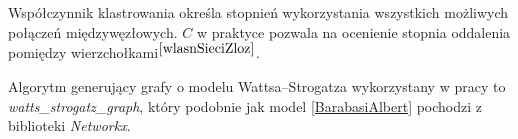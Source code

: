 \documentclass[a4paper, 12pt, twoside, openright]{article}
\begin{document}
	Współczynnik klastrowania określa stopnień wykorzystania wszystkich możliwych połączeń międzywęzłowych. $C$ w praktyce pozwala na ocenienie stopnia oddalenia pomiędzy wierzchołkami$^{\cite{wlasnSieciZloz}}$.
	
	 Algorytm generujący grafy o modelu Wattsa–Strogatza wykorzystany w pracy to \textit{watts\_strogatz\_graph}, który podobnie jak model \ref{BarabasiAlbert} pochodzi z biblioteki \textit{Networkx}.

\captionsetup{justification=centering}
\begin{figure}[!p]
	\centering
	\quad
	\quad
	\quad
	\quad

\end{figure}
\end{document}
